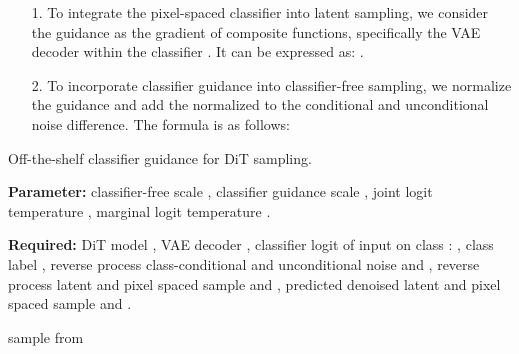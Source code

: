 \documentclass{article}
\theoremstyle{definition}
\begin{document}
\begin{enumerate}
    \item[1.]
To integrate the pixel-spaced classifier  into latent sampling, we consider the guidance  as the gradient of composite functions, specifically the VAE decoder  within the classifier . It can be expressed as:
.
\item[2.]
To incorporate classifier guidance  into classifier-free sampling, we normalize the guidance and add the normalized  to the conditional and unconditional noise difference. The formula is as follows:

\end{enumerate}

\begin{algorithm}
\caption{Off-the-shelf classifier guidance for DiT sampling.}\label{alg:dit_guidance}
\begin{algorithmic}
\State \textbf{Parameter:} classifier-free scale , classifier guidance scale , joint logit temperature , marginal logit temperature . 

\State \textbf{Required:} DiT model , VAE decoder , classifier logit of input  on class : , class label , reverse process class-conditional and unconditional noise  and , reverse process latent and pixel spaced sample  and , predicted denoised latent and pixel spaced sample  and . 

\State  sample from  
\For{ }  
\State 

\State  {}

\State  {}

\State 

\State  {}

\State  {}

\State  {}

\State 
\EndFor 
\State 
\State \Return 
\end{algorithmic}
\end{algorithm}
\end{document}
